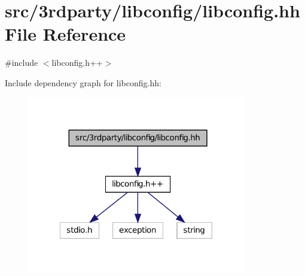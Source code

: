 \hypertarget{libconfig_8hh}{
\section{src/3rdparty/libconfig/libconfig.hh File Reference}
\label{libconfig_8hh}
}
{\ttfamily \#include $<$libconfig.h++$>$}\par
Include dependency graph for libconfig.hh:
\nopagebreak
\begin{figure}[H]
\begin{center}
\leavevmode
\includegraphics[width=270pt]{libconfig_8hh__incl}
\end{center}
\end{figure}
